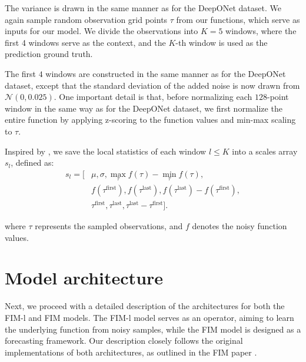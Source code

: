 \documentclass{article}
\theoremstyle{plain}
\theoremstyle{definition}
\theoremstyle{remark}
\begin{document}
The variance is drawn in the same manner as for the DeepONet dataset. We again sample random observation grid points \(\tau\) from our functions, which serve as inputs for our model. We divide the observations into \(K=5\) windows, where the first 4 windows serve as the context, and the \(K\)-th window is used as the prediction ground truth.

The first \(4\) windows are constructed in the same manner as for the DeepONet dataset, except that the standard deviation of the added noise is now drawn from \(\mathcal{N}(0, 0.025)\). One important detail is that, before normalizing each \(128\)-point window in the same way as for the DeepONet dataset, we first normalize the entire function by applying z-scoring to the function values and min-max scaling to \(\tau\).

Inspired by \cite{fim-l}, we save the local statistics of each window $l\leq K$ into a scales array \(s_l\), defined as:
\[
\begin{aligned}
s_l = [&\mu, \sigma, \max_{\tau} f(\tau) - \min_{\tau} f(\tau), \\
       &f(\tau^{\text{first}}), f(\tau^{\text{last}}), 
        f(\tau^{\text{last}}) - f(\tau^{\text{first}}), \\
       &\tau^{\text{first}}, \tau^{\text{last}}, 
        \tau^{\text{last}} - \tau^{\text{first}}].
\end{aligned}
\]


where \(\tau\) represents the sampled observations, and \(f\) denotes the noisy function values.



\section{Model architecture}
Next, we proceed with a detailed description of the architectures for both the FIM-l and FIM models. The FIM-l model serves as an operator, aiming to learn the underlying function from noisy samples, while the FIM model is designed as a forecasting framework. Our description closely follows the original implementations of both architectures, as outlined in the FIM paper \cite{fim-l}.
\end{document}
